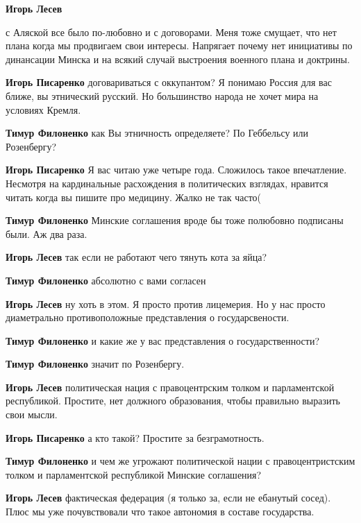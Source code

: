 \begin{itemize}
\begin{itemize}
\textbf{Игорь Лесев} 

с Аляской все было по-любовно и с договорами. Меня тоже смущает, что нет плана
когда мы продвигаем свои интересы. Напрягает почему нет инициативы по
динансации Минска и на всякий случай выстроения военного плана и доктрины.


\textbf{Игорь Писаренко} договариваться с оккупантом? Я понимаю Россия для вас ближе, вы этнический русский. Но большинство народа не хочет мира на условиях Кремля.

\textbf{Тимур Филоненко} как Вы этничность определяете? По Геббельсу или Розенбергу?

\textbf{Игорь Писаренко} Я вас читаю уже четыре года. Сложилось такое впечатление. Несмотря на кардинальные расхождения в политических взглядах, нравится читать когда вы пишите про медицину. Жалко не так часто(

\textbf{Тимур Филоненко} Минские соглашения вроде бы тоже полюбовно подписаны были. Аж два раза.

\textbf{Игорь Лесев} так если не работают чего тянуть кота за яйца?

\textbf{Тимур Филоненко} абсолютно с вами согласен

\textbf{Игорь Лесев} ну хоть в этом. Я просто против лицемерия. Но у нас просто диаметрально противоположные представления о государсвености.

\textbf{Тимур Филоненко} и какие же у вас представления о государственности?

\textbf{Тимур Филоненко} значит по Розенбергу.

\textbf{Игорь Лесев} политическая нация с правоцентрским толком и парламентской республикой. Простите, нет должного образования, чтобы правильно выразить свои мысли.

\textbf{Игорь Писаренко} а кто такой? Простите за безграмотность.

\textbf{Тимур Филоненко} и чем же угрожают политической нации с правоцентристским толком и парламентской республикой Минские соглашения?

\textbf{Игорь Лесев} фактическая федерация (я только за, если не ебанутый сосед). Плюс мы уже почувствовали что такое автономия в составе государства.


\end{itemize}
\end{itemize}
